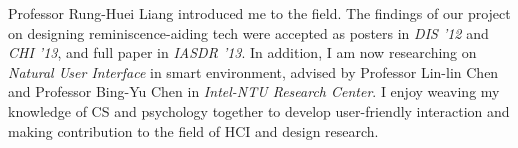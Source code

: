 \noindent
Professor Rung-Huei Liang introduced me to the field.
The findings of our project on designing reminiscence-aiding tech were accepted as posters in \textit{DIS '12} and \textit{CHI '13}, 
and full paper in \textit{IASDR '13}.
In addition, I am now researching on \textit{Natural User Interface} in smart environment,
advised by Professor Lin-lin Chen and Professor Bing-Yu Chen in \textit{Intel-NTU Research Center}.
I enjoy weaving my knowledge of CS and psychology together to develop user-friendly interaction 
and making contribution to the field of HCI and design research.\\

%

